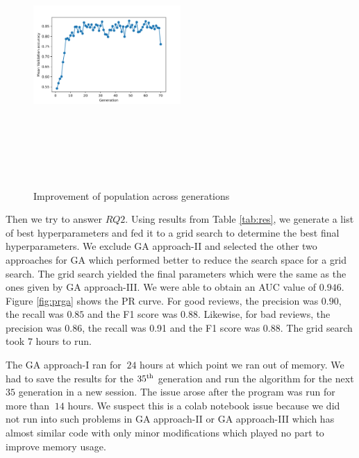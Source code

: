 \documentclass[conference]{IEEEtran}
\begin{document}
\begin{figure}
\includegraphics[width=0.5\textwidth, height=10cm, keepaspectratio]{genetic-type-3/genetic-type-3-all-gen.png}
\caption{Improvement of population across generations}
\label{fig:gmv}
\end{figure}

Then we try to answer $RQ2$. Using results from Table \ref{tab:res}, we generate a list of best hyperparameters and fed it to a grid search to determine the best final hyperparameters. We exclude GA approach-II and selected the other two approaches for GA which performed better to reduce the search space for a grid search. The grid search yielded the final parameters which were the same as the ones given by GA approach-III. We were able to obtain an AUC value of $0.946$. Figure \ref{fig:prga} shows the PR curve. For good reviews, the precision was $0.90$, the recall was $0.85$ and the F1 score was $0.88$. Likewise, for bad reviews, the precision was $0.86$, the recall was 0.91 and the F1 score was $0.88$. The grid search took $7$ hours to run.

The GA approach-I ran for $~24$ hours at which point we ran out of memory. We had to save the results for the $35\textsuperscript{th}$ generation and run the algorithm for the next $35$ generation in a new session. The issue arose after the program was run for more than $~14$ hours. We suspect this is a colab notebook issue because we did not run into such problems in GA approach-II or GA approach-III which has almost similar code with only minor modifications which played no part to improve memory usage. 
\end{document}
